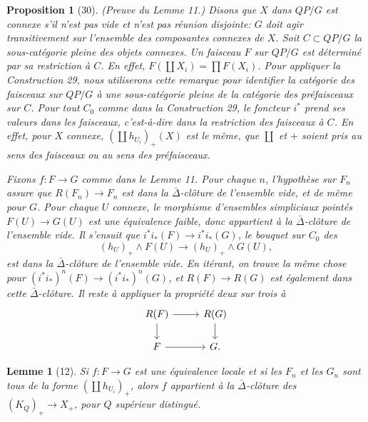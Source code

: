 \documentclass[11pt]{article}
\theoremstyle{deligne}
\newtheorem*{proposition*}{Proposition}
\newtheorem*{lemma*}{Lemme}
\begin{document}
\begin{proposition*}[30]
(Preuve du Lemme 11.) Disons que \(X\) dans \(QP/G\) est connexe s'il n'est pas vide et n'est pas réunion disjointe: \(G\) doit agir transitivement sur l'ensemble des composantes connexes de \(X\). Soit \(C\subset QP/G\) la sous-catégorie pleine des objets connexes. Un faisceau \(F\) sur \(QP/G\) est déterminé par sa restriction à \(C\). En effet, \(F(\coprod X_i)=\prod F(X_i)\). Pour appliquer la Construction 29, nous utiliserons cette remarque pour identifier la catégorie des faisceaux sur \(QP/G\) à une sous-catégorie pleine de la catégorie des préfaisceaux sur \(C\). Pour tout \(C_0\) comme dans la Construction 29, le foncteur \(i^*\) prend ses valeurs dans les faisceaux, c'est-à-dire dans la restriction des faisceaux à \(C\). En effet, pour \(X\) connexe, \((\coprod h_{U_i})_+(X)\) est le même, que \(\coprod\) et \(+\) soient pris au sens des faisceaux ou au sens des préfaisceaux.

Fixons \(f:F\to G\) comme dans le Lemme 11. Pour chaque \(n\), l'hypothèse sur \(F_n\) assure que \(R(F_n)\to F_n\) est dans la \(\bar\Delta\)-clôture de l'ensemble vide, et de même pour \(G\). Pour chaque \(U\) connexe, le morphisme d'ensembles simpliciaux pointés \(F(U)\to G(U)\) est une équivalence faible, donc appartient à la \(\bar\Delta\)-clôture de l'ensemble vide. Il s'ensuit que \(i^*i_*(F)\to i^*i_*(G)\), le bouquet sur \(C_0\) des
\[
(h_U)_+\wedge F(U)\longrightarrow (h_U)_+\wedge G(U),
\]
est dans la \(\bar\Delta\)-clôture de l'ensemble vide. En itérant, on trouve la même chose pour \((i^*i_*)^n(F)\to(i^*i_*)^n(G)\), et \(R(F)\to R(G)\) est également dans cette \(\bar\Delta\)-clôture. Il reste à appliquer la propriété deux sur trois à
\[
\begin{tikzcd}[column sep=2.6em,row sep=1.6em]
R(F) \arrow[r] \arrow[d] & R(G) \arrow[d] \\
F \arrow[r] & G .
\end{tikzcd}
\]
\end{proposition*}

\begin{lemma*}[12]
Si \(f:F\to G\) est une équivalence locale et si les \(F_n\) et les \(G_n\) sont tous de la forme \((\coprod h_{U_i})_+\), alors \(f\) appartient à la \(\bar\Delta\)-clôture des \((K_Q)_+\to X_+\), pour \(Q\) supérieur distingué.
\end{lemma*}
\end{document}
